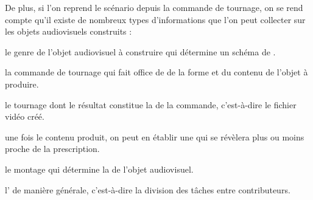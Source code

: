 De plus, si l'on reprend le scénario depuis la commande de tournage, on se rend compte qu'il existe de nombreux types d'informations que l'on peut collecter sur les objets audiovisuels construits :
\begin{liste}
	\item le genre de l'objet audiovisuel à construire qui détermine un schéma de . 
	\item la commande de tournage qui fait office de  de la forme et du contenu de l'objet à produire.
	\item le tournage dont le résultat constitue la  de la commande, c'est-à-dire le fichier vidéo créé.
	\item une fois le contenu produit, on peut en établir une  qui se révèlera plus ou moins proche de la prescription.
	\item le montage qui détermine la  de l'objet audiovisuel.
	\item l' de manière générale, c'est-à-dire la division des tâches entre contributeurs. 
\end{liste}

